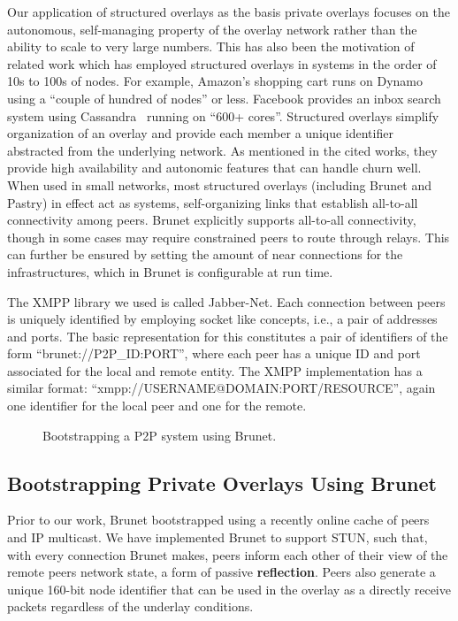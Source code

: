\documentclass[conference]{IEEEtran}
\begin{document}
Our application of structured overlays as the basis private overlays focuses on
the autonomous, self-managing property of the overlay network rather than the
ability to scale to very large numbers.  This has also been the motivation of
related work which has employed structured overlays in systems in the order of
10s to 100s of nodes.  For example, Amazon's shopping cart runs on
Dynamo~\cite{dynamo} using a ``couple of hundred of nodes'' or less.  Facebook
provides an inbox search system using Cassandra~\cite{cassandra} running on
``600+ cores''.  Structured overlays simplify organization of an overlay and
provide each member a unique identifier abstracted from the underlying network.
As mentioned in the cited works, they provide high availability and autonomic
features that can handle churn well.  When used in small networks, most
structured overlays (including Brunet and Pastry) in effect act as 
systems, self-organizing links that establish all-to-all connectivity among
peers.  Brunet explicitly supports all-to-all connectivity, though in some
cases may require constrained peers to route through relays.  This can further
be ensured by setting the amount of near connections for the infrastructures,
which in Brunet is configurable at run time.

The XMPP library we used is called Jabber-Net.  Each connection between peers
is uniquely identified by employing socket like concepts, i.e., a pair of
addresses and ports.  The basic representation for this constitutes a pair of
identifiers of the form ``brunet://P2P\_ID:PORT'', where each peer has a
unique ID and port associated for the local and remote entity.  The XMPP
implementation has a similar format: ``xmpp://USERNAME@DOMAIN:PORT/RESOURCE'',
again one identifier for the local peer and one for the remote.

\begin{figure*}[h!t!]
\centering
{}
\caption{Bootstrapping a P2P system using Brunet.}
\label{fig:bootstrap_brunet}
\end{figure*}

\subsection{Bootstrapping Private Overlays Using Brunet}
\label{brunet_bootstrapping}

Prior to our work, Brunet bootstrapped using a recently online cache of peers
and IP multicast.  We have implemented Brunet to support STUN, such that, with
every connection Brunet makes, peers inform each other of their view of the
remote peers network state, a form of passive \textbf{reflection}.  Peers also
generate a unique 160-bit node identifier that can be used in the overlay as a
directly receive packets regardless of the underlay conditions.
\end{document}
